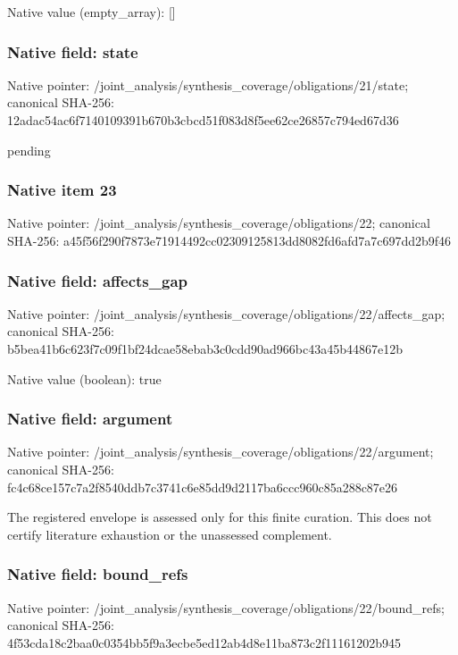 \documentclass[10pt,a4paper]{article}
\begin{document}
Native value (empty\_\allowbreak{}array): []

\subsubsection{Native field: state}
Native pointer: /joint\_\allowbreak{}analysis/synthesis\_\allowbreak{}coverage/obligations/21/state; canonical SHA-256: 12adac54ac6f7140109391b670b3cbcd51f083d8f5ee62ce26857c794ed67d36

\begingroup\raggedright\sloppy pending\par\endgroup

\subsubsection{Native item 23}
Native pointer: /joint\_\allowbreak{}analysis/synthesis\_\allowbreak{}coverage/obligations/22; canonical SHA-256: a45f56f290f7873e71914492cc02309125813dd8082fd6afd7a7c697dd2b9f46

\subsubsection{Native field: affects\_\allowbreak{}gap}
Native pointer: /joint\_\allowbreak{}analysis/synthesis\_\allowbreak{}coverage/obligations/22/affects\_\allowbreak{}gap; canonical SHA-256: b5bea41b6c623f7c09f1bf24dcae58ebab3c0cdd90ad966bc43a45b44867e12b

Native value (boolean): true

\subsubsection{Native field: argument}
Native pointer: /joint\_\allowbreak{}analysis/synthesis\_\allowbreak{}coverage/obligations/22/argument; canonical SHA-256: fc4c68ce157c7a2f8540ddb7c3741c6e85dd9d2117ba6ccc960c85a288c87e26

\begingroup\raggedright\sloppy The registered envelope is assessed only for this finite curation. This does not certify literature exhaustion or the unassessed complement.\par\endgroup

\subsubsection{Native field: bound\_\allowbreak{}refs}
Native pointer: /joint\_\allowbreak{}analysis/synthesis\_\allowbreak{}coverage/obligations/22/bound\_\allowbreak{}refs; canonical SHA-256: 4f53cda18c2baa0c0354bb5f9a3ecbe5ed12ab4d8e11ba873c2f11161202b945
\end{document}
